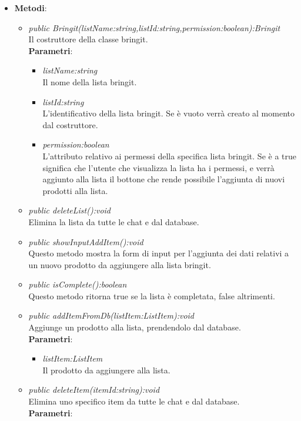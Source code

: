 \begin{itemize}
\item \textbf{Metodi}:
	\begin{itemize}
	\item \textit{public Bringit(listName:string,listId:string,permission:boolean):Bringit}\\
	Il costruttore della classe bringit.
					\\ \textbf{Parametri}: \begin{itemize}
			\item \textit{listName:string}\\
			Il nome della lista bringit.
			\item \textit{listId:string}\\
			L'identificativo della lista bringit. Se è vuoto verrà creato al momento dal costruttore.
			\item \textit{permission:boolean}\\
			L'attributo relativo ai permessi della specifica lista bringit. Se è a true significa che l'utente che visualizza la lista ha i permessi, e verrà aggiunto alla lista il bottone che rende possibile l'aggiunta di nuovi prodotti alla lista.
					\end{itemize}
	\item \textit{public deleteList():void}\\
	Elimina la lista da tutte le chat e dal database.
	\item \textit{public showInputAddItem():void}\\
	Questo metodo mostra la form di input per l'aggiunta dei dati relativi a un nuovo prodotto da aggiungere alla lista bringit.
	\item \textit{public isComplete():boolean}\\
	Questo metodo ritorna true se la lista è completata, false altrimenti.
	\item \textit{public addItemFromDb(listItem:ListItem):void}\\
	Aggiunge un prodotto alla lista, prendendolo dal database.
				\\ \textbf{Parametri}: \begin{itemize}
			\item \textit{listItem:ListItem}\\
			Il prodotto da aggiungere alla lista.
					\end{itemize} 
	\item \textit{public deleteItem(itemId:string):void}\\
	Elimina uno specifico item da tutte le chat e dal database.
				\\ \textbf{Parametri}: \begin{itemize}

\end{itemize}
\end{itemize}
\end{itemize}
